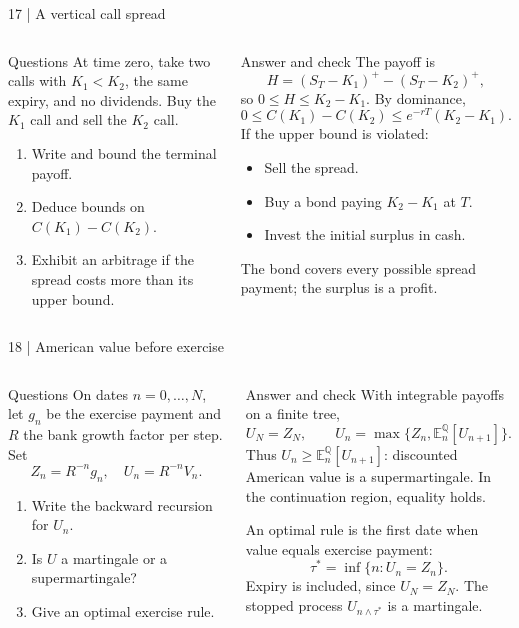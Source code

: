 \documentclass[handout,10pt,t,aspectratio=169]{beamer}
\newcommand{\E}{\mathbb E}
\newcommand{\Q}{\mathbb Q}
\newenvironment{questions}{\begin{block}{Questions}}{\end{block}}
\newenvironment{answers}{\begin{exampleblock}{Answer and check}}{\end{exampleblock}}
\newcommand{\compact}{\small%
 \setlength{\abovedisplayskip}{3pt}%
 \setlength{\belowdisplayskip}{3pt}%
 \setlength{\abovedisplayshortskip}{2pt}%
 \setlength{\belowdisplayshortskip}{2pt}%
 \setlength{\parskip}{2pt}}
\begin{document}
\begin{frame}{17 | A vertical call spread}
\compact
\begin{columns}[T,onlytextwidth]
\begin{questions}
At time zero, take two calls with \(K_1<K_2\), the same expiry, and no dividends.
Buy the \(K_1\) call and sell the \(K_2\) call.
\begin{enumerate}
\item Write and bound the terminal payoff.
\item Deduce bounds on \(C(K_1)-C(K_2)\).
\item Exhibit an arbitrage if the spread costs more than its upper bound.
\end{enumerate}
\end{questions}
\begin{answers}
The payoff is
\[
 H=(S_T-K_1)^+-(S_T-K_2)^+,
\]
so \(0\leq H\leq K_2-K_1\). By dominance,
\[
 \boxed{0\leq C(K_1)-C(K_2)
 \leq e^{-rT}(K_2-K_1).}
\]
If the upper bound is violated:
\begin{itemize}
\item Sell the spread.
\item Buy a bond paying \(K_2-K_1\) at \(T\).
\item Invest the initial surplus in cash.
\end{itemize}
The bond covers every possible spread payment; the surplus is a profit.
\end{answers}
\end{columns}
\end{frame}

\begin{frame}{18 | American value before exercise}
\compact
\begin{columns}[T,onlytextwidth]
\begin{questions}
On dates \(n=0,\ldots,N\), let \(g_n\) be the exercise payment and \(R\) the
bank growth factor per step. Set
\[
 Z_n=R^{-n}g_n,\quad U_n=R^{-n}V_n.
\]
\begin{enumerate}
\item Write the backward recursion for \(U_n\).
\item Is \(U\) a martingale or a supermartingale?
\item Give an optimal exercise rule.
\end{enumerate}
\end{questions}
\begin{answers}
With integrable payoffs on a finite tree,
\[
 U_N=Z_N,\qquad
 \boxed{U_n=\max\{Z_n,\E_n^\Q[U_{n+1}]\}.}
\]
Thus \(U_n\geq\E_n^\Q[U_{n+1}]\): discounted American value is a
supermartingale. In the continuation region, equality holds.

An optimal rule is the first date when value equals exercise payment:
\[
 \boxed{\tau^*=\inf\{n:U_n=Z_n\}.}
\]
Expiry is included, since \(U_N=Z_N\).
The stopped process \(U_{n\wedge\tau^*}\) is a martingale.
\end{answers}
\end{columns}
\end{frame}
\end{document}
